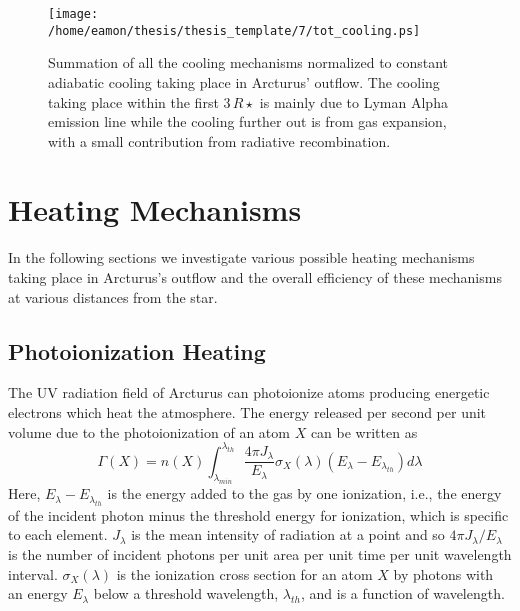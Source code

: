 \begin{figure}[!ht]
\centering 
         \texttt{[image: /home/eamon/thesis/thesis\_template/7/tot\_cooling.ps]}
\caption[Summation of all cooling mechanisms]{Summation of all the cooling mechanisms normalized to constant adiabatic cooling taking place in Arcturus' outflow. The cooling taking place within the first $3\,R\star$ is mainly due to Lyman Alpha emission line while the cooling further out is from gas expansion, with a small contribution from radiative recombination.}
\label{fig:7.2}
\end{figure}

\section{Heating Mechanisms}\label{sec:7.4}
In the following sections we investigate various possible heating mechanisms taking place in Arcturus's outflow and the  overall efficiency of these mechanisms at various distances from the star. 

\subsection{Photoionization Heating}\label{sec:7.4.1}
The UV radiation field of Arcturus can photoionize atoms producing energetic electrons which heat the atmosphere. The energy released per second per unit volume due to the photoionization of an atom $X$ can be written as
\begin{equation}\label{eq:7.20}
\Gamma (X) = n(X)\int ^{\lambda _{th}}_{\lambda _{min}}\frac{4\pi J_{\lambda}}{E _{\lambda}}\sigma _{X}(\lambda)(E_{\lambda} - E_{\lambda _{th}})d\lambda
\end{equation}
Here, $E_{\lambda} - E_{\lambda _{th}}$ is the energy added to the gas by one ionization, i.e., the energy of the incident photon minus the threshold energy for ionization, which is specific to each element. $J_{\lambda}$ is the 
mean intensity of radiation at a point and so $4\pi J_{\lambda}/E _{\lambda}$ is the number of incident photons per unit area per unit time per unit wavelength interval. $\sigma _{X}(\lambda)$ is the ionization cross section for an atom $X$ by photons with an energy $E_{\lambda}$ below a threshold wavelength, $\lambda _{th}$, and is a function of wavelength.

